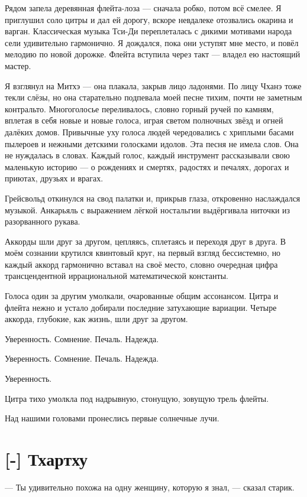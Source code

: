 Рядом запела деревянная флейта-лоза --- сначала робко, потом всё смелее.
Я приглушил соло цитры и дал ей дорогу, вскоре невдалеке отозвались окарина и варган.
Классическая музыка Тси-Ди переплеталась с дикими мотивами народа сели удивительно гармонично.
Я дождался, пока они уступят мне место, и повёл мелодию по новой дорожке.
Флейта вступила через такт --- владел ею настоящий мастер.

Я взглянул на Митхэ --- она плакала, закрыв лицо ладонями.
По лицу Чханэ тоже текли слёзы, но она старательно подпевала моей песне тихим, почти не заметным контральто.
Многоголосье переливалось, словно горный ручей по камням, вплетая в себя новые и новые голоса, играя светом полночных звёзд и огней далёких домов.
Привычные уху голоса людей чередовались с хриплыми басами пылероев и нежными детскими голосками идолов.
Эта песня не имела слов.
Она не нуждалась в словах.
Каждый голос, каждый инструмент рассказывали свою маленькую историю --- о рождениях и смертях, радостях и печалях, дорогах и приютах, друзьях и врагах.

Грейсвольд откинулся на свод палатки и, прикрыв глаза, откровенно наслаждался музыкой.
Анкарьяль с выражением лёгкой ностальгии выдёргивала ниточки из разорванного рукава.

Аккорды шли друг за другом, цепляясь, сплетаясь и переходя друг в друга.
В моём сознании крутился квинтовый круг, на первый взгляд бессистемно, но каждый аккорд гармонично вставал на своё место, словно очередная цифра трансцендентной иррациональной математической константы.

Голоса один за другим умолкали, очарованные общим ассонансом.
Цитра и флейта нежно и устало добирали последние затухающие вариации.
Четыре аккорда, глубокие, как жизнь, шли друг за другом.

Уверенность. Сомнение. Печаль. Надежда.

Уверенность. Сомнение. Печаль. Надежда.

Уверенность.

Цитра тихо умолкла под надрывную, стонущую, зовущую трель флейты.

Над нашими головами пронеслись первые солнечные лучи.

\section{[-] Тхартху}

\textspace

--- Ты удивительно похожа на одну женщину, которую я знал, --- сказал старик.

